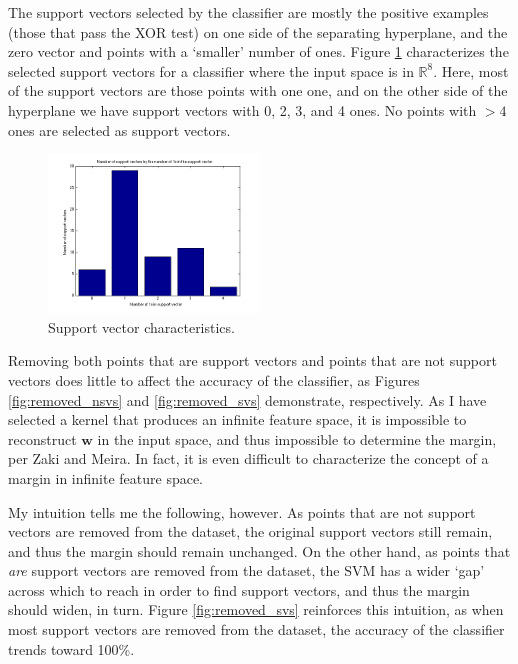 \documentclass[11pt]{article}
\begin{document}
\begin{enumerate}
The support vectors selected by the classifier are mostly the positive examples (those that pass the XOR test) on one side of the separating hyperplane, and the zero vector and points with a `smaller' number of ones. Figure \ref{fig:support_vectors} characterizes the selected support vectors for a classifier where the input space is in $\mathbb{R}^8$. Here, most of the support vectors are those points with one one, and on the other side of the hyperplane we have support vectors with 0, 2, 3, and 4 ones. No points with $>4$ ones are selected as support vectors.

\begin{figure}[H]
    \centering
    \includegraphics[width=0.5\textwidth]{support_vectors.png}
    \caption{Support vector characteristics.}
    \label{fig:support_vectors}
\end{figure}

Removing both points that are support vectors and points that are not support vectors does little to affect the accuracy of the classifier, as Figures \ref{fig:removed_nsvs} and \ref{fig:removed_svs} demonstrate, respectively. As I have selected a kernel that produces an infinite feature space, it is impossible to reconstruct $\mathbf{w}$ in the input space, and thus impossible to determine the margin, per Zaki and Meira. In fact, it is even difficult to characterize the concept of a margin in infinite feature space.

My intuition tells me the following, however. As points that are not support vectors are removed from the dataset, the original support vectors still remain, and thus the margin should remain unchanged. On the other hand, as points that \textit{are} support vectors are removed from the dataset, the SVM has a wider `gap' across which to reach in order to find support vectors, and thus the margin should widen, in turn. Figure \ref{fig:removed_svs} reinforces this intuition, as when most support vectors are removed from the dataset, the accuracy of the classifier trends toward 100\%.


\end{enumerate}
\end{document}
